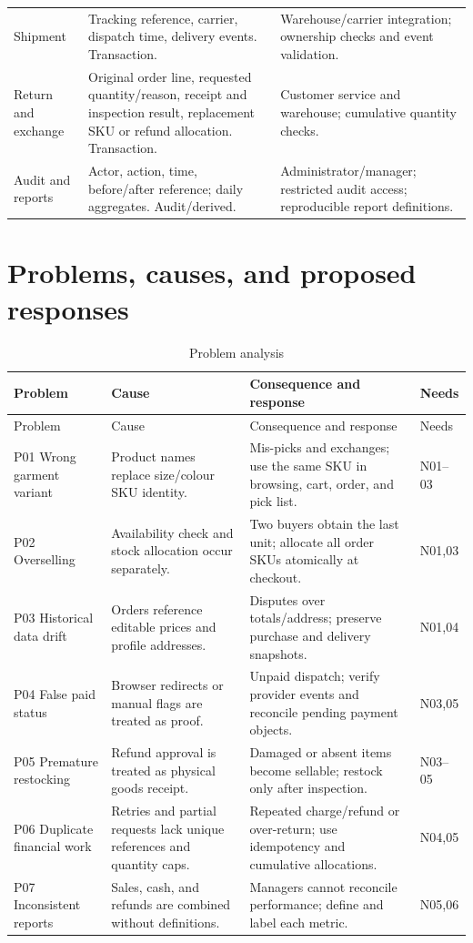 \begin{longtable}{P{.18\linewidth}P{.37\linewidth}P{.36\linewidth}}
Shipment & Tracking reference, carrier, dispatch time, delivery events. Transaction. & Warehouse/carrier integration; ownership checks and event validation.\\
Return and exchange & Original order line, requested quantity/reason, receipt and inspection result, replacement SKU or refund allocation. Transaction. & Customer service and warehouse; cumulative quantity checks.\\
Audit and reports & Actor, action, time, before/after reference; daily aggregates. Audit/derived. & Administrator/manager; restricted audit access; reproducible report definitions.\\
\bottomrule
\end{longtable}

\section{Problems, causes, and proposed responses}
\begin{longtable}{P{.19\linewidth}P{.27\linewidth}P{.35\linewidth}P{.1\linewidth}}
\caption{Problem analysis}\label{tab:problems}\\
\toprule Problem & Cause & Consequence and response & Needs \\\midrule\endfirsthead
\toprule Problem & Cause & Consequence and response & Needs \\\midrule\endhead
P01 Wrong garment variant & Product names replace size/colour SKU identity. & Mis-picks and exchanges; use the same SKU in browsing, cart, order, and pick list. & N01--03\\
P02 Overselling & Availability check and stock allocation occur separately. & Two buyers obtain the last unit; allocate all order SKUs atomically at checkout. & N01,03\\
P03 Historical data drift & Orders reference editable prices and profile addresses. & Disputes over totals/address; preserve purchase and delivery snapshots. & N01,04\\
P04 False paid status & Browser redirects or manual flags are treated as proof. & Unpaid dispatch; verify provider events and reconcile pending payment objects. & N03,05\\
P05 Premature restocking & Refund approval is treated as physical goods receipt. & Damaged or absent items become sellable; restock only after inspection. & N03--05\\
P06 Duplicate financial work & Retries and partial requests lack unique references and quantity caps. & Repeated charge/refund or over-return; use idempotency and cumulative allocations. & N04,05\\
P07 Inconsistent reports & Sales, cash, and refunds are combined without definitions. & Managers cannot reconcile performance; define and label each metric. & N05,06\\
\bottomrule
\end{longtable}

